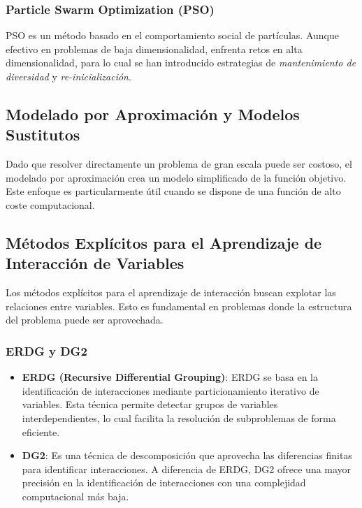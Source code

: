 \subsubsection*{Particle Swarm Optimization (PSO)}

PSO es un método basado en el comportamiento social de partículas. Aunque efectivo en problemas de baja dimensionalidad, enfrenta retos en alta dimensionalidad, para lo cual se han introducido estrategias de \textit{mantenimiento de diversidad} y \textit{re-inicialización}.

\subsection*{Modelado por Aproximación y Modelos Sustitutos}

Dado que resolver directamente un problema de gran escala puede ser costoso, el modelado por aproximación crea un modelo simplificado de la función objetivo. Este enfoque es particularmente útil cuando se dispone de una función de alto coste computacional.

\subsection*{Métodos Explícitos para el Aprendizaje de Interacción de Variables}

Los métodos explícitos para el aprendizaje de interacción buscan explotar las relaciones entre variables. Esto es fundamental en problemas donde la estructura del problema puede ser aprovechada.

\subsubsection*{ERDG y DG2}

\begin{itemize}
    \item \textbf{ERDG (Recursive Differential Grouping)}: ERDG se basa en la identificación de interacciones mediante particionamiento iterativo de variables. Esta técnica permite detectar grupos de variables interdependientes, lo cual facilita la resolución de subproblemas de forma eficiente.
    \item \textbf{DG2}: Es una técnica de descomposición que aprovecha las diferencias finitas para identificar interacciones. A diferencia de ERDG, DG2 ofrece una mayor precisión en la identificación de interacciones con una complejidad computacional más baja.
\end{itemize}

